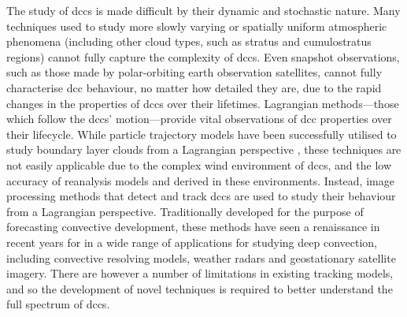 The study of \acrshort{dcc}s is made difficult by their dynamic and stochastic nature.
Many techniques used to study more slowly varying or spatially uniform atmospheric phenomena (including other cloud types, such as stratus and cumulostratus regions) cannot fully capture the complexity of \acrshort{dcc}s.
Even snapshot observations, such as those made by polar-orbiting earth observation satellites, cannot fully characterise \acrshort{dcc} behaviour, no matter how detailed they are, due to the rapid changes in the properties of \acrshort{dcc}s over their lifetimes.
Lagrangian methods---those which follow the \acrshort{dcc}s' motion---provide vital observations of \acrshort{dcc} properties over their lifecycle.
While particle trajectory models have been successfully utilised to study boundary layer clouds from a Lagrangian perspective \citep[e.g][]{eastman_competing_2018, christensen_aerosols_2020a}, these techniques are not easily applicable due to the complex wind environment of \acrshort{dcc}s, and the low accuracy of reanalysis models and derived  in these environments.
Instead, image processing methods that detect and track \acrshort{dcc}s are used to study their behaviour from a Lagrangian perspective.
Traditionally developed for the purpose of forecasting convective development, these methods have seen a renaissance in recent years for in a wide range of applications for studying deep convection, including convective resolving models, weather radars and geostationary satellite imagery.
There are however a number of limitations in existing tracking models, and so the development of novel techniques is required to better understand the full spectrum of \acrshort{dcc}s.

